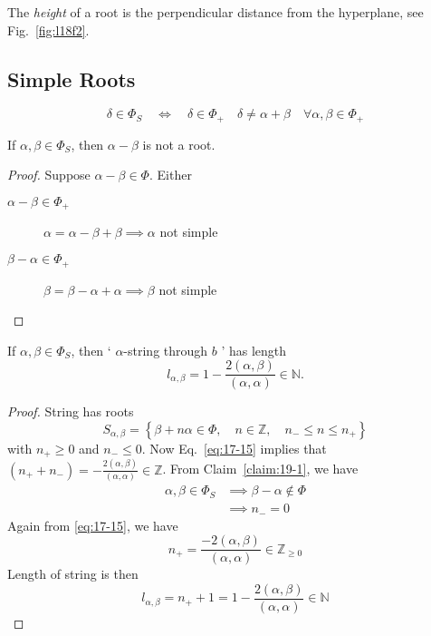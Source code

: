 
\begin{definition}[]
  The \emph{height} of a root is the perpendicular distance from the hyperplane, see Fig.~\ref{fig:l18f2}.
\end{definition}

\subsection{Simple Roots}%
\label{sub:simple_roots}

\begin{equation}
  \delta \in \Phi_S \quad \iff \quad \delta \in \Phi_+ \quad \delta \neq \alpha + \beta \quad \forall \alpha, \beta \in \Phi_+
\end{equation}
\begin{claim}
  \label{claim:19-1}
  If $\alpha, \beta \in \Phi_S$, then $\alpha - \beta$ is not a root.
\end{claim}
\begin{proof}
  Suppose $\alpha - \beta \in \Phi$. Either
  \begin{description}
    \item[$\alpha - \beta \in \Phi_+$] $\alpha = \alpha - \beta + \beta \implies \alpha$ not simple \smashtimes
    \item[$\beta - \alpha \in \Phi_+$] $\beta = \beta - \alpha + \alpha \implies \beta$ not simple \smashtimes
  \end{description}
\end{proof}
\begin{claim}
  If $\alpha, \beta \in \Phi_S$, then ` $\alpha$-string through $b$ ' has length
  \begin{equation}
    l_{\alpha, \beta} = 1 - \frac{2(\alpha, \beta)}{(\alpha, \alpha)} \in \mathbb{N}.
  \end{equation}
\end{claim}
\begin{proof}
  String has roots
  \begin{equation}
    S_{\alpha, \beta} = \left\{ \beta + n \alpha \in \Phi, \quad n \in \mathbb{Z}, \quad n_- \leq n \leq n_+ \right\}
  \end{equation}
  with $n_+ \geq 0$ and $n_- \leq 0$.
  Now Eq.~\eqref{eq:17-15} implies that $(n_+ + n_-) = -\frac{2 (\alpha, \beta)}{(\alpha, \alpha)} \in \mathbb{Z}$. From Claim~\ref{claim:19-1}, we have
  \begin{align}
    \alpha, \beta \in \Phi_S &\implies \beta - \alpha \not \in \Phi  \\
			     &\implies n_- = 0
  \end{align}
  Again from \eqref{eq:17-15}, we have
  \begin{equation}
    \label{eq:19-20}
    n_+ = \frac{-2 (\alpha, \beta)}{(\alpha, \alpha)} \in \mathbb{Z}_{\geq 0}
  \end{equation}
  Length of string is then
  \begin{equation}
    l_{\alpha, \beta} = n_+ + 1 = 1 - \frac{2 (\alpha, \beta)}{(\alpha, \alpha)} \in \mathbb{N}
  \end{equation}
\end{proof}
